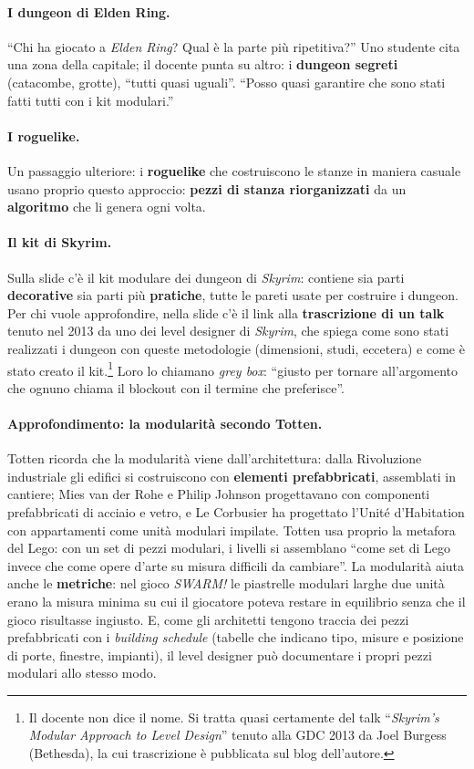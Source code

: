 \paragraph{I dungeon di Elden Ring.} ``Chi ha giocato a \emph{Elden Ring}? Qual
è la parte più ripetitiva?'' Uno studente cita una zona della capitale; il
docente punta su altro: i \textbf{dungeon segreti} (catacombe, grotte), ``tutti
quasi uguali''. ``Posso quasi garantire che sono stati fatti tutti con i kit
modulari.''

\paragraph{I roguelike.} Un passaggio ulteriore: i \textbf{roguelike} che
costruiscono le stanze in maniera casuale usano proprio questo approccio:
\textbf{pezzi di stanza riorganizzati} da un \textbf{algoritmo} che li genera
ogni volta.

\paragraph{Il kit di Skyrim.} Sulla slide c'è il kit modulare dei dungeon di
\emph{Skyrim}: contiene sia parti \textbf{decorative} sia parti più
\textbf{pratiche}, tutte le pareti usate per costruire i dungeon. Per chi vuole
approfondire, nella slide c'è il link alla \textbf{trascrizione di un talk}
tenuto nel 2013 da uno dei level designer di \emph{Skyrim}, che spiega come sono
stati realizzati i dungeon con queste metodologie (dimensioni, studi, eccetera)
e come è stato creato il kit.\footnote{Il docente non dice il nome. Si tratta
quasi certamente del talk ``\emph{Skyrim's Modular Approach to Level Design}''
tenuto alla GDC 2013 da Joel Burgess (Bethesda), la cui trascrizione è
pubblicata sul blog dell'autore.} Loro lo chiamano \emph{grey box}: ``giusto per
tornare all'argomento che ognuno chiama il blockout con il termine che
preferisce''.

\paragraph{Approfondimento: la modularità secondo Totten.} Totten ricorda che la
modularità viene dall'architettura: dalla Rivoluzione industriale gli edifici si
costruiscono con \textbf{elementi prefabbricati}, assemblati in cantiere; Mies
van der Rohe e Philip Johnson progettavano con componenti prefabbricati di
acciaio e vetro, e Le Corbusier ha progettato l'Unité d'Habitation con
appartamenti come unità modulari impilate. Totten usa proprio la metafora del
Lego: con un set di pezzi modulari, i livelli si assemblano ``come set di Lego
invece che come opere d'arte su misura difficili da cambiare''. La modularità
aiuta anche le \textbf{metriche}: nel gioco \emph{SWARM!} le piastrelle modulari
larghe due unità erano la misura minima su cui il giocatore poteva restare in
equilibrio senza che il gioco risultasse ingiusto. E, come gli architetti
tengono traccia dei pezzi prefabbricati con i \emph{building schedule} (tabelle
che indicano tipo, misure e posizione di porte, finestre, impianti), il level
designer può documentare i propri pezzi modulari allo stesso modo.

